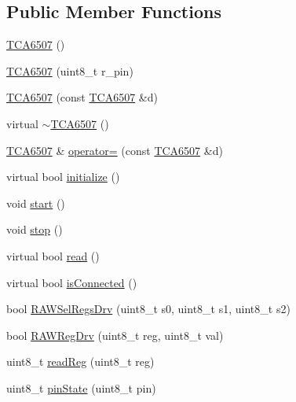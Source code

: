 \subsection*{Public Member Functions}
\begin{DoxyCompactItemize}
\item 
\hyperlink{classsmrtobj_1_1i2c_1_1_t_c_a6507_a150f61534c180db5eae06eabe84a23ff}{T\+C\+A6507} ()
\item 
\hyperlink{classsmrtobj_1_1i2c_1_1_t_c_a6507_a34e833d577e689c85df1a38cbe8597e0}{T\+C\+A6507} (uint8\+\_\+t r\+\_\+pin)
\item 
\hyperlink{classsmrtobj_1_1i2c_1_1_t_c_a6507_acdae96b9ad4df69b7db373b741875af9}{T\+C\+A6507} (const \hyperlink{classsmrtobj_1_1i2c_1_1_t_c_a6507}{T\+C\+A6507} \&d)
\item 
virtual \hyperlink{classsmrtobj_1_1i2c_1_1_t_c_a6507_ac71dca60bfff937556402fb8d4e74c94}{$\sim$\+T\+C\+A6507} ()
\item 
\hyperlink{classsmrtobj_1_1i2c_1_1_t_c_a6507}{T\+C\+A6507} \& \hyperlink{classsmrtobj_1_1i2c_1_1_t_c_a6507_a97c3c53eb57784c8443c05a6d8c8e67b}{operator=} (const \hyperlink{classsmrtobj_1_1i2c_1_1_t_c_a6507}{T\+C\+A6507} \&d)
\item 
virtual bool \hyperlink{classsmrtobj_1_1i2c_1_1_t_c_a6507_a630cc83b260aceec29c3f26e2c4ebe5e}{initialize} ()
\item 
void \hyperlink{classsmrtobj_1_1i2c_1_1_t_c_a6507_a34361f72e69f4342dbdd9e324fd3e13a}{start} ()
\item 
void \hyperlink{classsmrtobj_1_1i2c_1_1_t_c_a6507_a6f16cbe2d218b6c1a9182d67e2da20ac}{stop} ()
\item 
virtual bool \hyperlink{classsmrtobj_1_1i2c_1_1_t_c_a6507_adce687bb4bd2f248a1851b5d3e290181}{read} ()
\item 
virtual bool \hyperlink{classsmrtobj_1_1i2c_1_1_t_c_a6507_aae2ceb7c2ba719a2d86d47f58cf16306}{is\+Connected} ()
\item 
bool \hyperlink{classsmrtobj_1_1i2c_1_1_t_c_a6507_a53e7478510f82ce0b0ac85ab58de6ba2}{R\+A\+W\+Sel\+Regs\+Drv} (uint8\+\_\+t s0, uint8\+\_\+t s1, uint8\+\_\+t s2)
\item 
bool \hyperlink{classsmrtobj_1_1i2c_1_1_t_c_a6507_a37124e71b06ed662f215d97305d3cc8b}{R\+A\+W\+Reg\+Drv} (uint8\+\_\+t reg, uint8\+\_\+t val)
\item 
uint8\+\_\+t \hyperlink{classsmrtobj_1_1i2c_1_1_t_c_a6507_a7453556043cf9fc41fa28f6076022d83}{read\+Reg} (uint8\+\_\+t reg)
\item 
uint8\+\_\+t \hyperlink{classsmrtobj_1_1i2c_1_1_t_c_a6507_a267ba5d392d1e12ad29842a3ff113a61}{pin\+State} (uint8\+\_\+t pin)

\end{DoxyCompactItemize}
